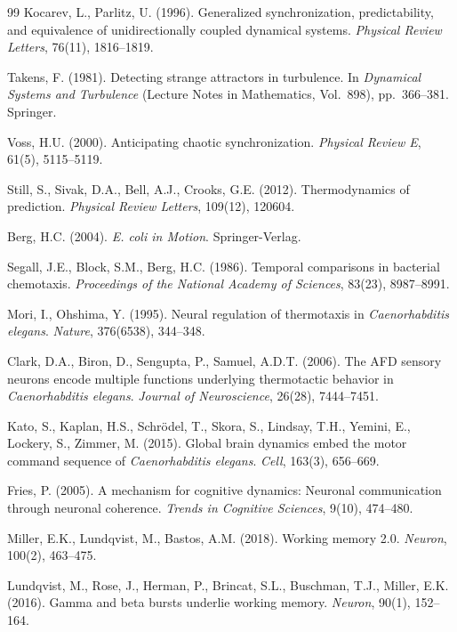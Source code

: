 \documentclass[12pt]{article}
\begin{document}
\begin{thebibliography}{99}
Kocarev, L., Parlitz, U. (1996). Generalized synchronization, predictability, and equivalence of unidirectionally coupled dynamical systems. \textit{Physical Review Letters}, 76(11), 1816--1819.

Takens, F. (1981). Detecting strange attractors in turbulence. In \textit{Dynamical Systems and Turbulence} (Lecture Notes in Mathematics, Vol.\ 898), pp.\ 366--381. Springer.

Voss, H.U. (2000). Anticipating chaotic synchronization. \textit{Physical Review E}, 61(5), 5115--5119.

Still, S., Sivak, D.A., Bell, A.J., Crooks, G.E. (2012). Thermodynamics of prediction. \textit{Physical Review Letters}, 109(12), 120604.


Berg, H.C. (2004). \textit{E. coli in Motion}. Springer-Verlag.

Segall, J.E., Block, S.M., Berg, H.C. (1986). Temporal comparisons in bacterial chemotaxis. \textit{Proceedings of the National Academy of Sciences}, 83(23), 8987--8991.

Mori, I., Ohshima, Y. (1995). Neural regulation of thermotaxis in \textit{Caenorhabditis elegans}. \textit{Nature}, 376(6538), 344--348.

Clark, D.A., Biron, D., Sengupta, P., Samuel, A.D.T. (2006). The AFD sensory neurons encode multiple functions underlying thermotactic behavior in \textit{Caenorhabditis elegans}. \textit{Journal of Neuroscience}, 26(28), 7444--7451.

Kato, S., Kaplan, H.S., Schr\"{o}del, T., Skora, S., Lindsay, T.H., Yemini, E., Lockery, S., Zimmer, M. (2015). Global brain dynamics embed the motor command sequence of \textit{Caenorhabditis elegans}. \textit{Cell}, 163(3), 656--669.

Fries, P. (2005). A mechanism for cognitive dynamics: Neuronal communication through neuronal coherence. \textit{Trends in Cognitive Sciences}, 9(10), 474--480.

Miller, E.K., Lundqvist, M., Bastos, A.M. (2018). Working memory 2.0. \textit{Neuron}, 100(2), 463--475.

Lundqvist, M., Rose, J., Herman, P., Brincat, S.L., Buschman, T.J., Miller, E.K. (2016). Gamma and beta bursts underlie working memory. \textit{Neuron}, 90(1), 152--164.


\end{thebibliography}
\end{document}
